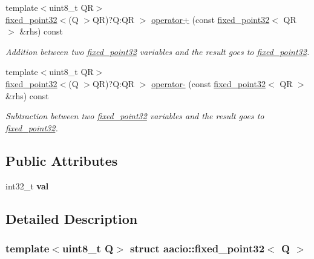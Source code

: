 \begin{DoxyCompactItemize}
\item 
{\footnotesize template$<$uint8\+\_\+t QR$>$ }\\\mbox{\hyperlink{structaacio_1_1fixed__point32}{fixed\+\_\+point32}}$<$(Q $>$QR)?Q\+:\+QR $>$ \mbox{\hyperlink{group__fixedpoint_gae544257783a230bb6b33942a19925f6f}{operator+}} (const \mbox{\hyperlink{structaacio_1_1fixed__point32}{fixed\+\_\+point32}}$<$ QR $>$ \&rhs) const
\begin{DoxyCompactList}\small\item\em Addition between two \mbox{\hyperlink{structaacio_1_1fixed__point32}{fixed\+\_\+point32}} variables and the result goes to \mbox{\hyperlink{structaacio_1_1fixed__point32}{fixed\+\_\+point32}}. \end{DoxyCompactList}\item 
{\footnotesize template$<$uint8\+\_\+t QR$>$ }\\\mbox{\hyperlink{structaacio_1_1fixed__point32}{fixed\+\_\+point32}}$<$(Q $>$QR)?Q\+:\+QR $>$ \mbox{\hyperlink{group__fixedpoint_ga3dba31f55ab94161ac1db5c7dda2e1ee}{operator-\/}} (const \mbox{\hyperlink{structaacio_1_1fixed__point32}{fixed\+\_\+point32}}$<$ QR $>$ \&rhs) const
\begin{DoxyCompactList}\small\item\em Subtraction between two \mbox{\hyperlink{structaacio_1_1fixed__point32}{fixed\+\_\+point32}} variables and the result goes to \mbox{\hyperlink{structaacio_1_1fixed__point32}{fixed\+\_\+point32}}. \end{DoxyCompactList}\end{DoxyCompactItemize}
\subsection*{Public Attributes}
\begin{DoxyCompactItemize}
\item 
\mbox{\label{structaacio_1_1fixed__point32_a9df6f193a90d99a2a7a42e2723c2e314}} 
int32\+\_\+t {\bfseries val}
\end{DoxyCompactItemize}


\subsection{Detailed Description}
\subsubsection*{template$<$uint8\+\_\+t Q$>$\newline
struct aacio\+::fixed\+\_\+point32$<$ Q $>$}

